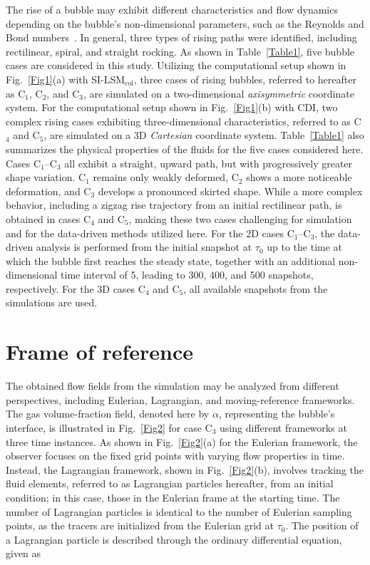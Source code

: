 \documentclass[a4paper,fleqn]{cas-sc}
\begin{document}
	The rise of a bubble may exhibit different characteristics and flow dynamics depending on the bubble's non-dimensional parameters, such as the Reynolds and Bond numbers~\cite{Cano-Lozano2016, Hua2007}. In general, three types of rising paths were identified, including rectilinear, spiral, and straight rocking. As shown in Table~\ref{Table1}, five bubble cases are considered in this study. Utilizing the computational setup shown in Fig.~\ref{Fig1}(a) with SI-LSM$_{\text{col}}$, three cases of rising bubbles, referred to hereafter as C$_1$, C$_2$, and C$_3$, are simulated on a two-dimensional \textit{axisymmetric} coordinate system. For the computational setup shown in Fig.~\ref{Fig1}(b) with CDI, two complex rising cases exhibiting three-dimensional characteristics, referred to as C$_4$ and C$_5$, are simulated on a 3D \textit{Cartesian} coordinate system. Table~\ref{Table1} also summarizes the physical properties of the fluids for the five cases considered here. Cases C$_1$--C$_3$ all exhibit a straight, upward path, but with progressively greater shape variation. C$_1$ remains only weakly deformed, C$_2$ shows a more noticeable deformation, and C$_3$ develops a pronounced skirted shape. While a more complex behavior, including a zigzag rise trajectory from an initial rectilinear path, is obtained in cases C$_4$ and C$_5$, making these two cases challenging for simulation and for the data-driven methods utilized here. For the 2D cases C$_1$--C$_3$, the data-driven analysis is performed from the initial snapshot at $\tau_0$ up to the time at which the bubble first reaches the steady state, together with an additional non-dimensional time interval of 5, leading to 300, 400, and 500 snapshots, respectively. For the 3D cases C$_4$ and C$_5$, all available snapshots from the simulations are used.
	
	\section{Frame of reference}
	\label{framework}
	
	The obtained flow fields from the simulation may be analyzed from different perspectives, including Eulerian, Lagrangian, and moving-reference frameworks. The gas volume-fraction field, denoted here by $\alpha$, representing the bubble's interface, is illustrated in Fig.~\ref{Fig2} for case C$_3$ using different frameworks at three time instances. As shown in Fig.~\ref{Fig2}(a) for the Eulerian framework, the observer focuses on the fixed grid points with varying flow properties in time. Instead, the Lagrangian framework, shown in Fig.~\ref{Fig2}(b), involves tracking the fluid elements, referred to as Lagrangian particles hereafter, from an initial condition; in this case, those in the Eulerian frame at the starting time. The number of Lagrangian particles is identical to the number of Eulerian sampling points, as the tracers are initialized from the Eulerian grid at $\tau_0$. The position of a Lagrangian particle is described through the ordinary differential equation, given as
	
\end{document}
